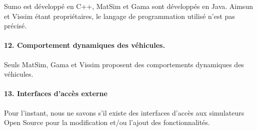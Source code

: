 Sumo est développé en C++, MatSim et Gama sont développés en Java. Aimsun et Vissim étant propriétaires, le langage de programmation utilisé n'est pas précisé.

\paragraph{12. Comportement dynamiques des véhicules.}

Seuls MatSim, Gama et Vissim proposent des comportements dynamiques des véhicules.

\paragraph{13. Interfaces d'accès externe}

Pour l'instant, nous ne savons s'il existe des interfaces d'accès aux simulateurs Open Source pour la modification et/ou l'ajout des fonctionnalités.

